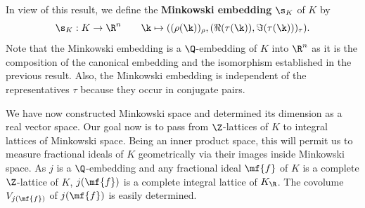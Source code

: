 \documentclass[12pt]{article}
\begin{document}
      In view of this result, we define the \textbf{Minkowski embedding} \(\s_{K}\) of \(K\) by
      \[
        \s_{K}:K \to \R^{n} \qquad \k \mapsto ((\rho(\k))_{\rho},(\Re(\tau(\k)),\Im(\tau(\k)))_{\tau}).
      \]
      Note that the Minkowski embedding is a \(\Q\)-embedding of \(K\) into \(\R^{n}\) as it is the composition of the canonical embedding and the isomorphism established in the previous result. Also, the Minkowski embedding is independent of the representatives \(\tau\) because they occur in conjugate pairs.
      
      We have now constructed Minkowski space and determined its dimension as a real vector space. Our goal now is to pass from \(\Z\)-lattices of \(K\) to integral lattices of Minkowski space. Being an inner product space, this will permit us to measure fractional ideals of \(K\) geometrically via their images inside Minkowski space. As \(j\) is a \(\Q\)-embedding and any fractional ideal \(\mf{f}\) of \(K\) is a complete \(\Z\)-lattice of \(K\), \(j(\mf{f})\) is a complete integral lattice of \(K_{\R}\). The covolume \(V_{j(\mf{f})}\) of \(j(\mf{f})\) is easily determined.
\end{document}
